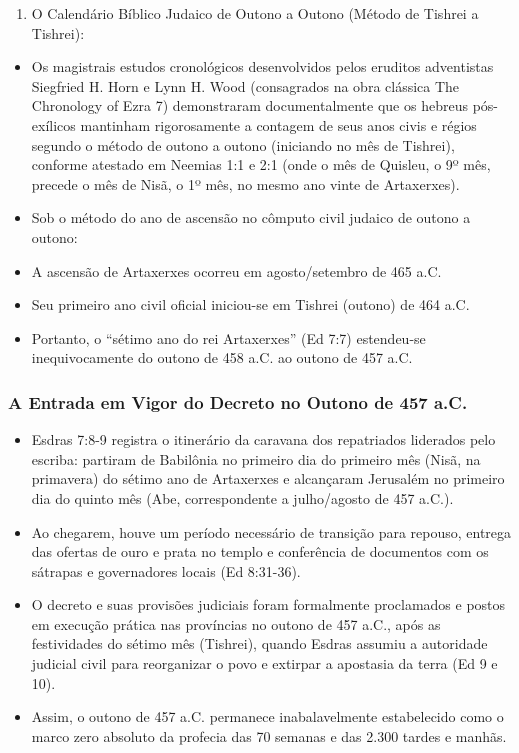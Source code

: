 \begin{enumerate}
  \item O Calendário Bíblico Judaico de Outono a Outono (Método de Tishrei a Tishrei):
\end{enumerate}

\begin{itemize}
  \item Os magistrais estudos cronológicos desenvolvidos pelos eruditos adventistas Siegfried H. Horn e Lynn H. Wood (consagrados na obra clássica The Chronology of Ezra 7) demonstraram documentalmente que os hebreus pós-exílicos mantinham rigorosamente a contagem de seus anos civis e régios segundo o método de outono a outono (iniciando no mês de Tishrei), conforme atestado em Neemias 1:1 e 2:1 (onde o mês de Quisleu, o 9º mês, precede o mês de Nisã, o 1º mês, no mesmo ano vinte de Artaxerxes).
  \item Sob o método do ano de ascensão no cômputo civil judaico de outono a outono:
  \item A ascensão de Artaxerxes ocorreu em agosto/setembro de 465 a.C.
  \item Seu primeiro ano civil oficial iniciou-se em Tishrei (outono) de 464 a.C.
  \item Portanto, o ``sétimo ano do rei Artaxerxes'' (Ed 7:7) estendeu-se inequivocamente do outono de 458 a.C. ao outono de 457 a.C.
\end{itemize}



\subsubsection*{A Entrada em Vigor do Decreto no Outono de 457 a.C.}
\begin{itemize}
  \item Esdras 7:8-9 registra o itinerário da caravana dos repatriados liderados pelo escriba: partiram de Babilônia no primeiro dia do primeiro mês (Nisã, na primavera) do sétimo ano de Artaxerxes e alcançaram Jerusalém no primeiro dia do quinto mês (Abe, correspondente a julho/agosto de 457 a.C.).
  \item Ao chegarem, houve um período necessário de transição para repouso, entrega das ofertas de ouro e prata no templo e conferência de documentos com os sátrapas e governadores locais (Ed 8:31-36).
  \item O decreto e suas provisões judiciais foram formalmente proclamados e postos em execução prática nas províncias no outono de 457 a.C., após as festividades do sétimo mês (Tishrei), quando Esdras assumiu a autoridade judicial civil para reorganizar o povo e extirpar a apostasia da terra (Ed 9 e 10).
  \item Assim, o outono de 457 a.C. permanece inabalavelmente estabelecido como o marco zero absoluto da profecia das 70 semanas e das 2.300 tardes e manhãs.
\end{itemize}




